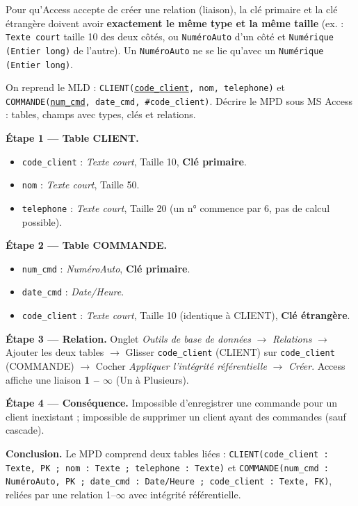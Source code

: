 \documentclass[11pt]{article}
\begin{document}
\begin{attention}
Pour qu'Access accepte de créer une relation (liaison), la clé primaire et la clé étrangère doivent avoir \textbf{exactement le même type et la même taille} (ex. : \texttt{Texte court} taille 10 des deux côtés, ou \texttt{NuméroAuto} d'un côté et \texttt{Numérique (Entier long)} de l'autre). Un \texttt{NuméroAuto} ne se lie qu'avec un \texttt{Numérique (Entier long)}.
\end{attention}

\begin{exoresolu}
On reprend le MLD : \texttt{CLIENT(\underline{code\_client}, nom, telephone)} et \texttt{COMMANDE(\underline{num\_cmd}, date\_cmd, \#code\_client)}. Décrire le MPD sous MS Access : tables, champs avec types, clés et relations.

\tcblower
\textbf{Étape 1 — Table CLIENT.}
\begin{itemize}
\item \texttt{code\_client} : \emph{Texte court}, Taille 10, \textbf{Clé primaire}.
\item \texttt{nom} : \emph{Texte court}, Taille 50.
\item \texttt{telephone} : \emph{Texte court}, Taille 20 (un n° commence par 6, pas de calcul possible).
\end{itemize}

\textbf{Étape 2 — Table COMMANDE.}
\begin{itemize}
\item \texttt{num\_cmd} : \emph{NuméroAuto}, \textbf{Clé primaire}.
\item \texttt{date\_cmd} : \emph{Date/Heure}.
\item \texttt{code\_client} : \emph{Texte court}, Taille 10 (identique à CLIENT), \textbf{Clé étrangère}.
\end{itemize}

\textbf{Étape 3 — Relation.} Onglet \emph{Outils de base de données} $\to$ \emph{Relations} $\to$ Ajouter les deux tables $\to$ Glisser \texttt{code\_client} (CLIENT) sur \texttt{code\_client} (COMMANDE) $\to$ Cocher \emph{Appliquer l'intégrité référentielle} $\to$ \emph{Créer}. Access affiche une liaison \textbf{1 -- $\infty$} (Un à Plusieurs).

\textbf{Étape 4 — Conséquence.} Impossible d'enregistrer une commande pour un client inexistant ; impossible de supprimer un client ayant des commandes (sauf cascade).

\textbf{Conclusion.} Le MPD comprend deux tables liées : \texttt{CLIENT(code\_client : Texte, PK ; nom : Texte ; telephone : Texte)} et \texttt{COMMANDE(num\_cmd : NuméroAuto, PK ; date\_cmd : Date/Heure ; code\_client : Texte, FK)}, reliées par une relation 1--$\infty$ avec intégrité référentielle.
\end{exoresolu}
\end{document}
